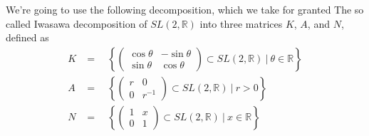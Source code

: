 \documentclass[
]{article}
\begin{document}
We're going to use the following decomposition, which we take for
granted 
The so called Iwasawa decomposition of \(SL(2, \mathbb{R})\) into three
matrices \(K\), \(A\), and \(N\), defined as
\begin{align}
K & =\quad \left\{ \begin{pmatrix} \cos\theta & -\sin\theta \\ \sin\theta & \cos\theta\end{pmatrix} \subset SL(2, \mathbb{R})  \ | \ \theta \in \mathbb{R} \right\} \\
A & =\quad \left\{ \begin{pmatrix} r & 0 \\ 0 & r^{-1} \end{pmatrix} \subset SL(2, \mathbb{R})  \ | \ r > 0 \right\} \\
N & =\quad \left\{ \begin{pmatrix} 1 & x \\ 0 & 1 \end{pmatrix} \subset SL(2, \mathbb{R})  \ | \ x \in \mathbb{R} \right\}\\
\end{align}
\end{document}

